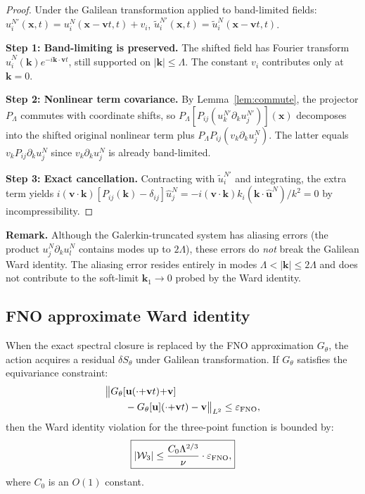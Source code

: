 \begin{proof}
Under the Galilean transformation applied to band-limited fields: $u_i^{N'}(\mathbf{x},t) = u_i^N(\mathbf{x}-\mathbf{v}t,t) + v_i$, $\tilde{u}_i^{N'}(\mathbf{x},t) = \tilde{u}_i^N(\mathbf{x}-\mathbf{v}t,t)$.

\textbf{Step 1: Band-limiting is preserved.} The shifted field has Fourier transform $\hat{u}_i^N(\mathbf{k})e^{-i\mathbf{k}\cdot\mathbf{v}t}$, still supported on $|\mathbf{k}|\leq\Lambda$. The constant $v_i$ contributes only at $\mathbf{k}=0$.

\textbf{Step 2: Nonlinear term covariance.} By Lemma~\ref{lem:commute}, the projector $P_\Lambda$ commutes with coordinate shifts, so $P_\Lambda[P_{ij}(u_k^{N'}\partial_k u_j^{N'})](\mathbf{x})$ decomposes into the shifted original nonlinear term plus $P_\Lambda P_{ij}(v_k\partial_k u_j^N)$. The latter equals $v_k P_{ij}\partial_k u_j^N$ since $v_k\partial_k u_j^N$ is already band-limited.

\textbf{Step 3: Exact cancellation.} Contracting with $\tilde{u}_i^{N'}$ and integrating, the extra term yields $i(\mathbf{v}\cdot\mathbf{k})[P_{ij}(\mathbf{k})-\delta_{ij}]\hat{u}_j^N = -i(\mathbf{v}\cdot\mathbf{k})k_i(\mathbf{k}\cdot\hat{\mathbf{u}}^N)/k^2 = 0$ by incompressibility.
\end{proof}

\textbf{Remark.} Although the Galerkin-truncated system has aliasing errors (the product $u_j^N\partial_k u_l^N$ contains modes up to $2\Lambda$), these errors do \emph{not} break the Galilean Ward identity. The aliasing error resides entirely in modes $\Lambda<|\mathbf{k}|\leq 2\Lambda$ and does not contribute to the soft-limit $\mathbf{k}_1\to 0$ probed by the Ward identity.

\subsection{FNO approximate Ward identity\label{app:ward_fno}}

When the exact spectral closure is replaced by the FNO approximation $G_\theta$, the action acquires a residual $\delta S_\theta$ under Galilean transformation. If $G_\theta$ satisfies the equivariance constraint:
\begin{equation}\label{eq:equivariance}
\begin{aligned}
&\bigl\|G_\theta[\mathbf{u}(\cdot{+}\mathbf{v}t){+}\mathbf{v}] \\
&\qquad - G_\theta[\mathbf{u}](\cdot{+}\mathbf{v}t) - \mathbf{v}\bigr\|_{L^2} \leq \varepsilon_{\text{FNO}},
\end{aligned}
\end{equation}
then the Ward identity violation for the three-point function is bounded by:
\begin{equation}\label{eq:ward_bound}
\boxed{|\mathcal{W}_3| \leq \frac{C_0\Lambda^{2/3}}{\nu}\cdot\varepsilon_{\text{FNO}},}
\end{equation}
where $C_0$ is an $O(1)$ constant.

